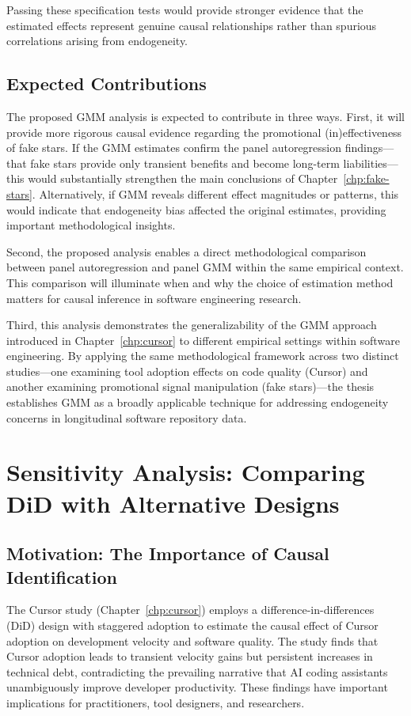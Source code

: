Passing these specification tests would provide stronger evidence that the estimated effects represent genuine causal relationships rather than spurious correlations arising from endogeneity.

\subsection{Expected Contributions}

The proposed GMM analysis is expected to contribute in three ways.
First, it will provide more rigorous causal evidence regarding the promotional (in)effectiveness of fake stars.
If the GMM estimates confirm the panel autoregression findings---that fake stars provide only transient benefits and become long-term liabilities---this would substantially strengthen the main conclusions of Chapter~\ref{chp:fake-stars}.
Alternatively, if GMM reveals different effect magnitudes or patterns, this would indicate that endogeneity bias affected the original estimates, providing important methodological insights.

Second, the proposed analysis enables a direct methodological comparison between panel autoregression and panel GMM within the same empirical context.
This comparison will illuminate when and why the choice of estimation method matters for causal inference in software engineering research.

Third, this analysis demonstrates the generalizability of the GMM approach introduced in Chapter~\ref{chp:cursor} to different empirical settings within software engineering.
By applying the same methodological framework across two distinct studies---one examining tool adoption effects on code quality (Cursor) and another examining promotional signal manipulation (fake stars)---the thesis establishes GMM as a broadly applicable technique for addressing endogeneity concerns in longitudinal software repository data.

\section{Sensitivity Analysis: Comparing DiD with Alternative Designs}
\label{sec:proposed-sensitivity}

\subsection{Motivation: The Importance of Causal Identification}

The Cursor study (Chapter~\ref{chp:cursor}) employs a difference-in-differences (DiD) design with staggered adoption to estimate the causal effect of Cursor adoption on development velocity and software quality.
The study finds that Cursor adoption leads to transient velocity gains but persistent increases in technical debt, contradicting the prevailing narrative that AI coding assistants unambiguously improve developer productivity.
These findings have important implications for practitioners, tool designers, and researchers.

